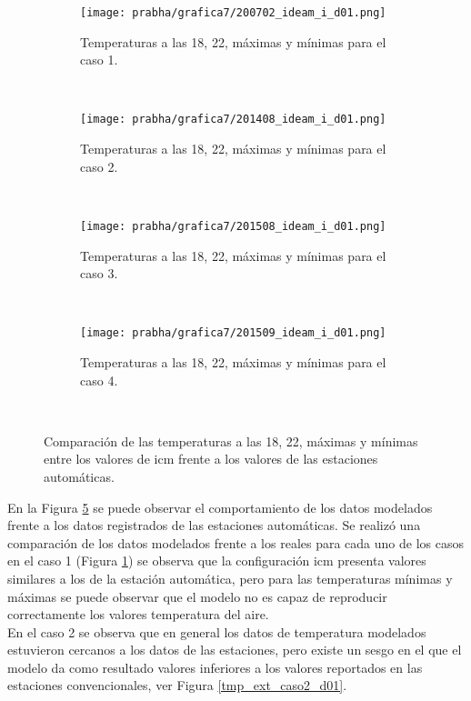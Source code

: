 \begin{figure}[H]
    \centering
    \begin{subfigure}[b]{0.45\textwidth}
        \caption{Temperaturas a las 18, 22, máximas y mínimas para el caso 1.}
	\texttt{[image: prabha/grafica7/200702\_ideam\_i\_d01.png]}
    \label{subfig:tmp_ext_caso1_d01}
	\end{subfigure}
	~
	    \begin{subfigure}[b]{0.45\textwidth}
        \caption{Temperaturas a las 18, 22, máximas y mínimas para el caso 2.}
	\texttt{[image: prabha/grafica7/201408\_ideam\_i\_d01.png]}

    \label{subfig:tmp_ext_caso2_d01}
	\end{subfigure}
	~
	    \begin{subfigure}[b]{0.45\textwidth}
        \caption{Temperaturas a las 18, 22, máximas y mínimas para el caso 3.}
	\texttt{[image: prabha/grafica7/201508\_ideam\_i\_d01.png]}
    \label{subfig:tmp_ext_cas3_d01}
	\end{subfigure}
	~
	    \begin{subfigure}[b]{0.45\textwidth}
        \caption{Temperaturas a las 18, 22, máximas y mínimas para el caso 4.}
	\texttt{[image: prabha/grafica7/201509\_ideam\_i\_d01.png]}
    
    \label{subfig:tmp_ext_caso4_d01}
	\end{subfigure}
	~

\caption{Comparación de las temperaturas a las 18, 22, máximas y mínimas entre los valores de icm frente a los valores de las estaciones automáticas.}	
\label{subfig:tmp_ext_d01}	
\end{figure}

En la Figura \ref{subfig:tmp_ext_d01} se puede observar el comportamiento de los datos modelados frente a los datos registrados de las estaciones automáticas. Se realizó una comparación de los datos modelados frente a los reales para cada uno de los casos en el caso 1 (Figura \ref{subfig:tmp_ext_caso1_d01}) se observa que la configuración icm presenta valores similares a los de la estación automática, pero para las temperaturas mínimas y máximas se puede observar que el modelo no es capaz de reproducir correctamente los valores temperatura del aire.\\

En el caso 2 se observa que en general los datos de temperatura modelados estuvieron cercanos a los datos de las estaciones, pero existe un sesgo en el que el modelo da como resultado valores inferiores a los valores reportados en las estaciones convencionales, ver Figura \ref{tmp_ext_caso2_d01}.\\

